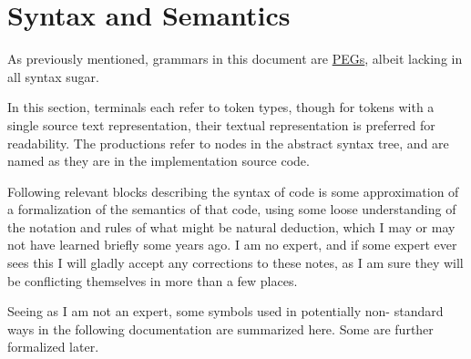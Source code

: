 \section{Syntax and Semantics}
\label{sec:syntax}

As previously mentioned, grammars in this document are
\href{https://en.wikipedia.org/wiki/Parsing_expression_grammar}{PEGs},
albeit lacking in all syntax sugar.

In this section, terminals each refer to token types, though for tokens
with a single source text representation, their textual representation
is preferred for readability. The productions refer to nodes in the
abstract syntax tree, and are named as they are in the implementation
source code.

Following relevant blocks describing the syntax of \Trilogy{} code is some
approximation of a formalization of the semantics of that code, using some
loose understanding of the notation and rules of what might be natural
deduction, which I may or may not have learned briefly some years ago.
I am no expert, and if some expert ever sees this I will gladly accept any
corrections to these notes, as I am sure they will be conflicting themselves
in more than a few places.

Seeing as I am not an expert, some symbols used in potentially non-
standard ways in the following documentation are summarized here.
Some are further formalized later.

